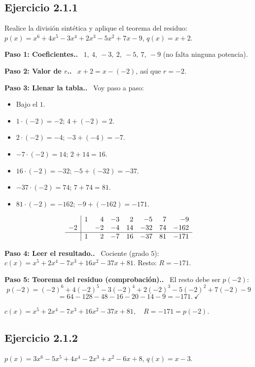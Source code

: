 \documentclass[11pt,a4paper]{article}
\newcommand{\paso}[1]{\par\medskip\noindent\textbf{\textcolor{blue!50!black}{Paso #1.}}\ }
\begin{document}
\subsection{Ejercicio 2.1.1}
\begin{enunciado}
Realice la división sintética y aplique el teorema del residuo:
$p(x)=x^6+4x^5-3x^4+2x^3-5x^2+7x-9$, \quad $q(x)=x+2$.
\end{enunciado}

\paso{1: Coeficientes.} $1,\ 4,\ -3,\ 2,\ -5,\ 7,\ -9$ (no falta ninguna potencia).

\paso{2: Valor de $r$.} $x+2=x-(-2)$, así que $r=-2$.

\paso{3: Llenar la tabla.} Voy paso a paso:
\begin{itemize}[nosep]
  \item Bajo el $1$.
  \item $1\cdot(-2)=-2$; $4+(-2)=2$.
  \item $2\cdot(-2)=-4$; $-3+(-4)=-7$.
  \item $-7\cdot(-2)=14$; $2+14=16$.
  \item $16\cdot(-2)=-32$; $-5+(-32)=-37$.
  \item $-37\cdot(-2)=74$; $7+74=81$.
  \item $81\cdot(-2)=-162$; $-9+(-162)=-171$.
\end{itemize}
\[
\begin{array}{r|rrrrrrr}
 & 1 & 4 & -3 & 2 & -5 & 7 & -9\\
-2 & & -2 & -4 & 14 & -32 & 74 & -162\\ \hline
 & 1 & 2 & -7 & 16 & -37 & 81 & -171
\end{array}
\]
\paso{4: Leer el resultado.}
Cociente (grado $5$): $c(x)=x^5+2x^4-7x^3+16x^2-37x+81$. \quad Resto: $R=-171$.

\paso{5: Teorema del residuo (comprobación).} El resto debe ser $p(-2)$:
\[ p(-2)=(-2)^6+4(-2)^5-3(-2)^4+2(-2)^3-5(-2)^2+7(-2)-9 \]
\[ =64-128-48-16-20-14-9=-171.\ \checkmark \]
\begin{respuesta}
$c(x)=x^5+2x^4-7x^3+16x^2-37x+81,\quad R=-171=p(-2).$
\end{respuesta}

\subsection{Ejercicio 2.1.2}
\begin{enunciado}
$p(x)=3x^6-5x^5+4x^4-2x^3+x^2-6x+8$, \quad $q(x)=x-3$.
\end{enunciado}
\end{document}
